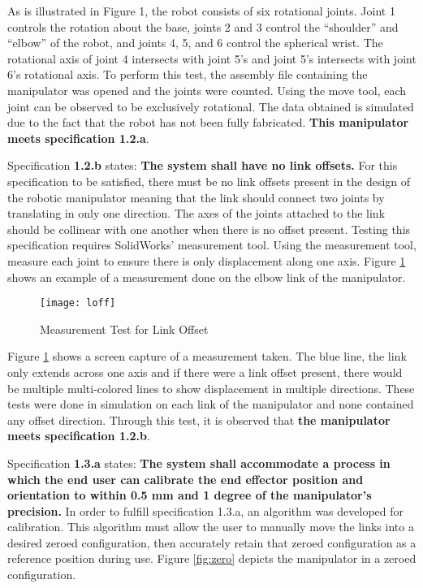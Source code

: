 As is illustrated in Figure 1, the robot consists of six rotational joints. Joint 1 controls the rotation about the base,  joints 2 and 3 control the “shoulder” and “elbow” of the robot, and joints 4, 5, and 6 control the  spherical wrist. The rotational axis of joint 4 intersects with joint 5’s and joint 5’s intersects with joint 6’s rotational axis. To perform this test, the assembly file containing the manipulator was opened and the joints were counted. Using the move tool, each joint can be observed to be exclusively rotational. The data obtained is simulated due to the fact that the robot has not been fully fabricated. \textbf{This manipulator meets specification 1.2.a}.

Specification \textbf{1.2.b} states: \textbf{The system shall have no link offsets.} For this specification to be satisfied, there must be no link offsets present in the design of the robotic manipulator meaning that the link should connect two joints by translating in only one direction. The axes of the joints attached to the link should be collinear with one another when there is no offset present. Testing this specification requires SolidWorks’ measurement tool. Using the measurement tool, measure each joint to ensure there is only displacement along one axis. Figure \ref{fig:loff} shows an example of a measurement done on the elbow link of the manipulator.

\newpage
\begin{figure}[htp]
  \centering
  \texttt{[image: loff]}
  \caption{Measurement Test for Link Offset}
  \label{fig:loff}
\end{figure}

Figure \ref{fig:loff} shows a screen capture of a measurement taken. The blue line, the link only extends across one axis and if there were a link offset present, there would be multiple multi-colored lines to show displacement in multiple directions. These tests were done in simulation on each link of the manipulator and none contained any offset direction. Through this test, it is observed that \textbf{the manipulator meets specification 1.2.b}.

Specification \textbf{1.3.a} states: \textbf{The system shall accommodate a process in which the end user can calibrate the end effector position and orientation to within 0.5 mm and 1 degree of the manipulator’s precision.} In order to fulfill specification 1.3.a, an algorithm was developed for calibration. This algorithm must allow the user to manually move the links into a desired zeroed configuration, then accurately retain that zeroed configuration as a reference position during use. Figure \ref{fig:zero} depicts the manipulator in a zeroed configuration.

